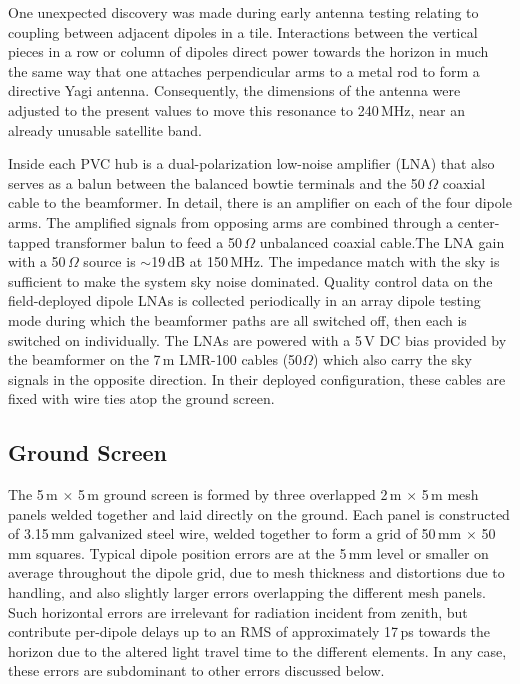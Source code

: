 One unexpected discovery was made during early antenna testing relating to coupling between adjacent dipoles in a tile. Interactions between the vertical pieces in a row or column of dipoles direct power towards the horizon in much the same way that one attaches perpendicular arms to a metal rod to form a directive Yagi antenna. Consequently, the dimensions of the antenna were adjusted to the present values to move this resonance to 240\,MHz, near an already unusable satellite band. 

Inside each PVC hub is a dual-polarization low-noise amplifier (LNA) that also serves as a balun between the balanced bowtie terminals and the 50\,$\Omega$ coaxial cable to the beamformer. In detail, there is an amplifier on each of the four dipole arms. The amplified signals from opposing arms are combined through a center-tapped transformer balun to feed a 50\,$\Omega$ unbalanced coaxial cable.The LNA gain with a 50\,$\Omega$ source is $\sim$19\,dB at 150\,MHz. The impedance match with the sky is sufficient to make the system sky noise dominated. Quality control data on the field-deployed dipole LNAs is collected periodically in an array dipole testing mode during which the beamformer paths are all switched off, then each is switched on individually. The LNAs are powered with a 5\,V DC bias provided by the beamformer on the 7\,m LMR-100 cables (50$\Omega$) which also carry the sky signals in the opposite direction. In their deployed configuration, these cables are fixed with wire ties atop the ground screen. 

\subsection{Ground Screen}
\label{sec:groundscreen}
The 5\,m $\times$ 5\,m ground screen is formed by three overlapped 2\,m $\times$ 5\,m mesh panels welded together and laid directly on the ground. Each panel is constructed of 3.15\,mm galvanized steel wire, welded together to form a grid of 50\,mm $\times$ 50\,mm squares. Typical dipole position errors are at the 5\,mm level or smaller on average throughout the dipole grid, due to mesh thickness and distortions due to handling, and also slightly larger errors overlapping the different mesh panels. Such horizontal errors are irrelevant for radiation incident from zenith, but contribute per-dipole delays up to an RMS of approximately 17\,ps towards the horizon due to the altered light travel time to the different elements. In any case, these errors are subdominant to other errors discussed below.

